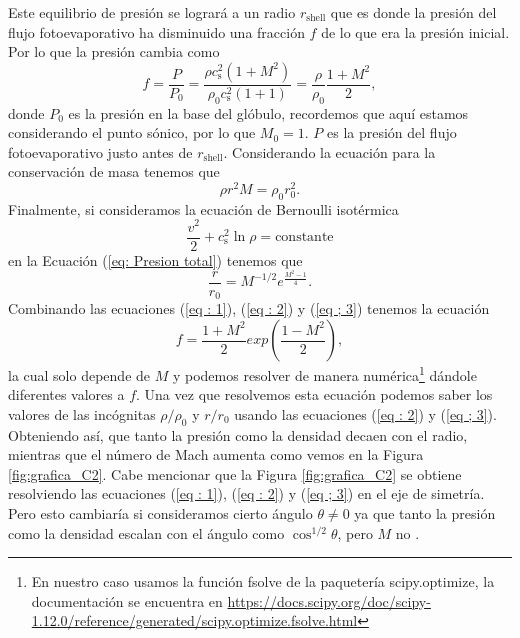 \documentclass{book}
\begin{document}
Este equilibrio de presión se logrará a un radio $r_\mathrm{shell}$
que es donde la presión del flujo fotoevaporativo ha disminuido una
fracción $f$ de lo que era la presión inicial. Por lo que la presión
cambia como
\begin{equation}\label{eq : 1}
f=\frac{P}{P_0}=\frac{\rho c_\mathrm{s}^2(1+M^2)}{\rho_0 c_\mathrm{s}^2(1+1)}=\frac{\rho}{\rho_0}\frac{1+M^2}{2},
\end{equation}
donde $P_0$ es la presión en la base del glóbulo, recordemos que aquí
estamos considerando el punto sónico, por lo que $M_0=1$. $P$ es la
presión del flujo fotoevaporativo justo antes de $r_\mathrm{shell}$.
Considerando la ecuación para la conservación de masa tenemos que
\begin{equation}\label{eq : 2}
\rho r^2M	=\rho_0 r_0^2.
\end{equation}
Finalmente, si consideramos la ecuación de Bernoulli isotérmica 
\begin{equation}
\frac{v^2}{2}+c_\mathrm{s}^2\ln\rho=\text{constante}
\end{equation}
en la Ecuación (\ref{eq: Presion total}) tenemos que \citep{Dyson:1968}
\begin{equation}\label{eq ; 3} \frac{r}{r_0}=M^{-1/2}e^{\frac{M^2-1}{4}}.
\end{equation}
Combinando las ecuaciones (\ref{eq : 1}), (\ref{eq : 2}) y (\ref{eq ;
  3}) tenemos la ecuación
\begin{equation}
    f=\frac{1+M^2}{2}exp\left(\frac{1-M^2}{2}\right),
\end{equation}
la cual solo depende de $M$ y podemos resolver de manera
numérica\footnote{En nuestro caso usamos la función fsolve de la
  paquetería scipy.optimize, la documentación se encuentra en
  \url{https://docs.scipy.org/doc/scipy-1.12.0/reference/generated/scipy.optimize.fsolve.html}}
dándole diferentes valores a $f$. Una vez que resolvemos esta ecuación
podemos saber los valores de las incógnitas $\rho/\rho_0$ y $r/r_0$ usando
las ecuaciones (\ref{eq : 2}) y (\ref{eq ; 3}). Obteniendo así, que
tanto la presión como la densidad decaen con el radio, mientras que el
número de Mach aumenta como vemos en la Figura \ref{fig:grafica_C2}.
Cabe mencionar que la Figura \ref{fig:grafica_C2} se obtiene
resolviendo las ecuaciones (\ref{eq : 1}), (\ref{eq : 2}) y (\ref{eq ;
  3}) en el eje de simetría. Pero esto cambiaría si consideramos
cierto ángulo $\theta\neq 0 $ ya que tanto la presión como la densidad escalan
con el ángulo como $\cos^{1/2}\theta$, pero $M$ no \citep{Tarango:2018}.
\end{document}
